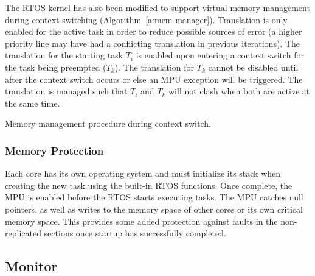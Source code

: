 
	The RTOS kernel has also been modified to support virtual memory management during context switching (Algorithm~\ref{a:mem-manager}). 
	Translation is only enabled for the active task in order to reduce possible sources of error (a higher priority line may have had a conflicting translation in previous iterations). 
	The translation for the starting task $T_i$ is enabled upon entering a context switch for the task being preempted ($T_k$). 
	The translation for $T_k$ cannot be disabled until after the context switch occurs or else an MPU exception will be triggered. 
	The translation is managed such that $T_i$ and $T_k$ will not clash when both are active at the same time.

\begin{algorithm}
	\caption{Memory management procedure during context switch.}
	\label{a:mem-manager}
\end{algorithm}




\subsubsection{Memory Protection}
\label{s:mem-prot}
	Each core has its own operating system and must initialize its stack when creating the new task using the built-in RTOS functions. 
	Once complete, the MPU is enabled before the RTOS starts executing tasks. 
	The MPU catches null pointers, as well as writes to the memory space of other cores or its own critical memory space. 
	This provides some added protection against faults in the non-replicated sections once startup has successfully completed.

\subsection{Monitor}
\label{s:mon}
	

